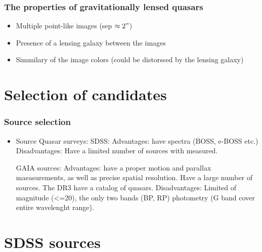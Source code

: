 \documentclass{beamer}
\begin{document}
\begin{frame}
\end{frame}

\begin{frame}
\frametitle{The properties of gravitationally lensed quasars}
    \begin{itemize}
        \item Multiple point-like images (sep $\approx 2"$) 
        \item Presence of a lensing galaxy between the images
        \item Simmilary of the image colors (could be distorssed by the lensing galaxy)
    \end{itemize} 
\end{frame}

\section{Selection of candidates}
\begin{frame}
    \frametitle{Source selection}
    \begin{itemize}
        \item Source Quasar surveys: 
        SDSS:
        Advantages: have spectra (BOSS, e-BOSS etc.) 
        Disadvantages: Have a limited number of sources with measured. 

        GAIA sources: 
        Advantages: have a proper motion and parallax maeasurements,
        as well as precise spatial resolution. Have a large number of sources. The DR3 have a catalog of quasars.
        Disadvantages: Limited of magnitude (<=20), the only two bands (BP, RP) photometry (G band cover entire wavelenght range).

    \end{itemize}
\end{frame}

\section{SDSS sources}
\end{document}
